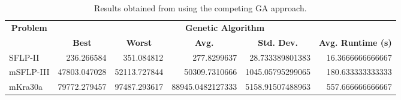 \begin{table}[h!]
\begin{adjustwidth}{-1.15in}{}
\centering
\begin{tabular}{|l|r|r|r|r|r|} 
	\hline
	\multicolumn{1}{|c|}{\multirow{2}{*}{\textbf{Problem}}} & \multicolumn{5}{c|}{\textbf{Genetic Algorithm}}                                                                                                                                                           \\ 
	\cline{2-6}
	\multicolumn{1}{|c|}{}                                  & \multicolumn{1}{c|}{\textbf{Best}} & \multicolumn{1}{c|}{\textbf{Worst}} & \multicolumn{1}{c|}{\textbf{Avg.}} & \multicolumn{1}{c|}{\textbf{Std. Dev.}} & \multicolumn{1}{c|}{\textbf{Avg. Runtime (s)}}  \\ 
	\hline
	SFLP-II                                                 & 236.266584                         & 351.084812                          & 277.8299637                        & 28.733389801383                         & 16.3666666666667                                \\ 
	\hline
	mSFLP-III                                               & 47803.047028                       & 52113.727844                        & 50309.7310666                      & 1045.05795299065                        & 180.633333333333                                \\ 
	\hline
	mKra30a                                                 & 79772.279457                       & 97487.293617                        & 88945.0482127333                   & 5158.91507488963                        & 557.666666666667                                \\
	\hline
\end{tabular}
\end{adjustwidth}
\caption{Results obtained from using the competing GA approach.}
\label{approach-ga-results}
\end{table}

